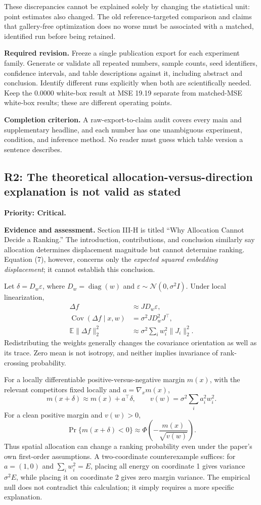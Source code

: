 \documentclass[11pt,a4paper]{article}
\newcommand{\finding}[3]{\subsection{#1: #3}\label{rev:#1}\textbf{Priority: #2.}}
\newcommand{\evidence}{\par\textbf{Evidence and assessment.} }
\newcommand{\action}{\par\textbf{Required revision.} }
\newcommand{\acceptance}{\par\textbf{Completion criterion.} }
\begin{document}
These discrepancies cannot be explained solely by changing the statistical unit: point estimates also changed. The old reference-targeted comparison and claims that gallery-free optimization does no worse must be associated with a matched, identified run before being retained.

\action
Freeze a single publication export for each experiment family. Generate or validate all repeated numbers, sample counts, seed identifiers, confidence intervals, and table descriptions against it, including abstract and conclusion. Identify different runs explicitly when both are scientifically needed. Keep the $0.0000$ white-box result at MSE 19.19 separate from matched-MSE white-box results; these are different operating points.
\acceptance
A raw-export-to-claim audit covers every main and supplementary headline, and each number has one unambiguous experiment, condition, and inference method. No reader must guess which table version a sentence describes.

\finding{R2}{Critical}{The theoretical allocation-versus-direction explanation is not valid as stated}
\evidence
Section III-H is titled ``Why Allocation Cannot Decide a Ranking.'' The introduction, contributions, and conclusion similarly say allocation determines displacement magnitude but cannot determine ranking. Equation (7), however, concerns only the \emph{expected squared embedding displacement}; it cannot establish this conclusion.

Let $\delta=D_w\varepsilon$, where $D_w=\operatorname{diag}(w)$ and $\varepsilon\sim\mathcal N(0,\sigma^2I)$. Under local linearization,
\begin{align}
\Delta f &\approx JD_w\varepsilon,\\
\operatorname{Cov}(\Delta f\mid x,w)&=\sigma^2JD_w^2J^\top,\label{eq:review_cov}\\
\mathbb E\|\Delta f\|_2^2&\approx\sigma^2\sum_i w_i^2\|J_i\|_2^2.
\end{align}
Redistributing the weights generally changes the covariance orientation as well as its trace. Zero mean is not isotropy, and neither implies invariance of rank-crossing probability.

For a locally differentiable positive-versus-negative margin $m(x)$, with the relevant competitors fixed locally and $a=\nabla_xm(x)$,
\begin{equation}
m(x+\delta)\approx m(x)+a^\top\delta,
\qquad
v(w)=\sigma^2\sum_i a_i^2w_i^2.
\end{equation}
For a clean positive margin and $v(w)>0$,
\begin{equation}
\Pr\{m(x+\delta)<0\}\approx
\Phi\!\left(-\frac{m(x)}{\sqrt{v(w)}}\right).
\end{equation}
Thus spatial allocation can change a ranking probability even under the paper's own first-order assumptions. A two-coordinate counterexample suffices: for $a=(1,0)$ and $\sum_iw_i^2=E$, placing all energy on coordinate 1 gives variance $\sigma^2E$, while placing it on coordinate 2 gives zero margin variance. The empirical null does not contradict this calculation; it simply requires a more specific explanation.
\end{document}
